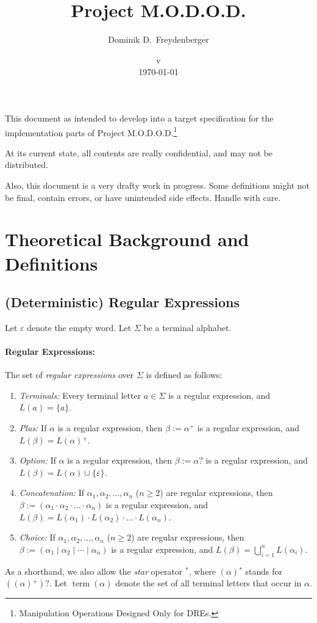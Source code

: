 \documentclass[a4paper,11pt, svgnames,titlepage]{article}
\date{v\svnfilerev\\ \today}
\title{Project M.O.D.O.D.}
\author{Dominik D.\ Freydenberger}
\newcommand{\rxp}{{^\mathtt{+}}}
\newcommand{\rxs}{{^\mathtt{*}}}
\newcommand{\rxo}{\mathtt{?}}
\newcommand{\rxc}{\cdot}
\DeclareMathOperator{\ror}{\mathtt{|}}
\newcommand{\emptyword}{\varepsilon}
\newcommand{\df}{:=}
\DeclareMathOperator{\term}{term}
\begin{document}
\maketitle
\pagestyle{fancy}

This document as intended to develop into a target specification for the implementation parts of Project M.O.D.O.D.\footnote{Manipulation Operations Designed Only for DREs.}%

At its current state, all contents are really confidential, and may not be distributed.

Also, this document is a very drafty work in progress. Some definitions might not be final, contain errors, or have unintended side effects. Handle with care.
\section{Theoretical Background and Definitions}

\subsection{(Deterministic) Regular Expressions}\label{sec:dredef}
Let $\emptyword$ denote the empty word. Let $\Sigma$ be a terminal alphabet. 

\paragraph{Regular Expressions:} The set of \emph{regular expressions} over $\Sigma$ is defined as follows:
\begin{enumerate}
	\item \emph{Terminals:} Every terminal letter $a\in \Sigma$ is a regular expression, and $L(a)=\{a\}$.
	\item \emph{Plus:} If $\alpha$ is a regular expression, then $\beta\df\alpha\rxp$ is a regular expression, and $L(\beta)=L(\alpha)\rxp$.
	\item \emph{Option:} If $\alpha$ is a regular expression, then $\beta\df\alpha\rxo$ is a regular expression, and $L(\beta)=L(\alpha)\cup\{\emptyword\}$.
	\item \emph{Concatenation:} If $\alpha_1,\alpha_2,\ldots,\alpha_n$ ($n\geq 2$) are regular expressions, then $\beta\df(\alpha_1\rxc \alpha_2 \rxc \ldots \rxc \alpha_n)$ is a regular expression, and $L(\beta)=L(\alpha_1)\cdot L(\alpha_2)\cdot \ldots \cdot L(\alpha_n)$.
	\item \emph{Choice:} If $\alpha_1,\alpha_2,\ldots,\alpha_n$ ($n\geq 2$) are regular expressions, then $\beta\df(\alpha_1\ror \alpha_2 \ror \cdots \ror \alpha_n)$ is a regular expression, and $L(\beta)=\bigcup_{i=1}^{n} L(\alpha_i)$.
\end{enumerate}
As a shorthand, we also allow the \emph{star} operator $\rxs$, where $(\alpha)\rxs$ stands for $((\alpha)\rxp)\rxo$. Let $\term(\alpha)$ denote the set of all terminal letters that occur in $\alpha$.
\end{document}
